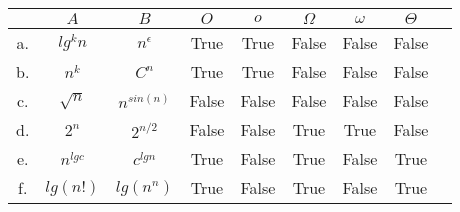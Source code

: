 \documentclass{article}
\begin{document}
\begin{enumerate}
\begin{table}[h!tb]
\Large
\centering
{\begin{tabular}{ |c|c|c|c|c|c|c|c|c| }
  \hline
   & $A$ & $B$ & $O$ & $o$ & $\Omega$ & $\omega$ & $\Theta$ \\
  \hline
  a. & $lg^kn$ & $n^\epsilon$  & True & True & False & False & False\\ 
  \hline
  b. & $n^k$ & $C^n$  & True & True & False & False & False\\ 
  \hline
  c.  & $\sqrt{n}$ & $n^{sin(n)}$  & False & False & False & False & False\\ 
  \hline
  d. & $2^n$ & $2^{n/2}$  & False &False & True & True & False\\ 
  \hline
  e. & $n^{lgc}$ & $c^{lgn}$  & True &False & True & False & True\\ 
  \hline
  f. & $lg(n!)$ & $lg(n^n)$  & True & False & True & False & True\\
 

  \hline
\end{tabular}}
\label{}
\end{table}

\end{enumerate}
\end{document}
